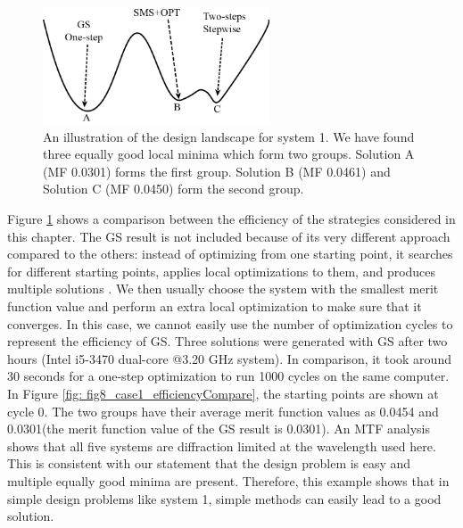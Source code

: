 \begin{figure}[h!]
    \centering
    \includegraphics[width=0.6\textwidth]{chapter-5/figures/Fig7_Landscape_illustration_sys1-2.png}
    \caption{An illustration of the design landscape for system 1. We have found three equally good local minima which form two groups. Solution A (MF 0.0301) forms the first group. Solution B (MF 0.0461) and Solution C (MF 0.0450) form the second group.}
    \label{fig: fig7_landscape_illus}
\end{figure}


Figure \ref{fig: fig7_landscape_illus} shows a comparison between the efficiency of the strategies considered in this chapter. The GS result is not included because of its very different approach compared to the others: instead of optimizing from one starting point, it searches for different starting points, applies local optimizations to them, and produces multiple solutions \cite{codevmanual}. We then usually choose the system with the smallest merit function value and perform an extra local optimization to make sure that it converges. In this case, we cannot easily use the number of optimization cycles to represent the efficiency of GS. Three solutions were generated with GS after two hours (Intel i5-3470 dual-core @3.20 GHz system). In comparison, it took around 30 seconds for a one-step optimization to run 1000 cycles on the same computer. In Figure \ref{fig: fig8_case1_efficiencyCompare}, the starting points are shown at cycle 0. The two groups have their average merit function values as 0.0454 and 0.0301(the merit function value of the GS result is 0.0301). An MTF analysis shows that all five systems are diffraction limited at the wavelength used here. This is consistent with our statement that the design problem is easy and multiple equally good minima are present. Therefore, this example shows that in simple design problems like system 1, simple methods can easily lead to a good solution. 

